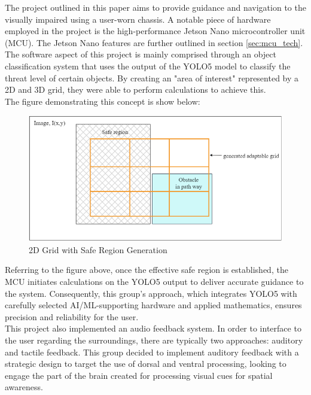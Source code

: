 \noindent The project outlined in this paper \cite{CVRef1} aims to provide guidance and navigation to the visually impaired using a user-worn chassis. A notable piece of hardware employed in the project is the high-performance Jetson Nano microcontroller unit (MCU). The Jetson Nano features are further outlined in section \ref{sec:mcu_tech}. \\

\noindent The software aspect of this project is mainly comprised through an object classification system that uses the output of the YOLO5 model to classify the threat level of certain objects. By creating an "area of interest" represented by a 2D and 3D grid, they were able to perform calculations to achieve this. \\

\noindent The figure demonstrating this concept is show below:
				
\begin{figure}[H]
	\centering
	\includegraphics[width=\textwidth]{./Images/Figure1_Grid_Detection.png}
	\caption{\label{fig:Grid-Generatio}2D Grid with Safe Region Generation}
\end{figure}

\noindent Referring to the figure above, once the effective safe region is established, the MCU initiates calculations on the YOLO5 output to deliver accurate guidance to the system. Consequently, this group's approach, which integrates YOLO5 with carefully selected AI/ML-supporting hardware and applied mathematics, ensures precision and reliability for the user. \\

\noindent This project also implemented an audio feedback system. In order to interface to the user regarding the surroundings, there are typically two approaches: auditory and tactile feedback. This group decided to implement auditory feedback with a strategic design to target the use of dorsal and ventral processing, looking to engage the part of the brain created for processing visual cues for spatial awareness.\\


